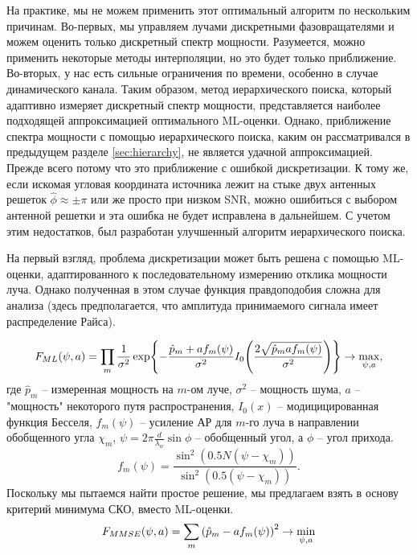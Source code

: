 На практике, мы не можем применить этот оптимальный алгоритм по нескольким
причинам. Во-первых, мы управляем лучами дискретными фазовращателями и можем
оценить только дискретный спектр мощности. Разумеется, можно применить некоторые
методы интерполяции, но это будет только приближение.  Во-вторых, у нас есть
сильные ограничения по времени, особенно в случае динамического канала.  Таким
образом, метод иерархического поиска, который адаптивно измеряет дискретный
спектр мощности, представляется наиболее подходящей аппроксимацией оптимального
ML-оценки.  Однако, приближение спектра мощности с помощью иерархического
поиска, каким он рассматривался в предыдущем разделе \eqref{sec:hierarchy}, не
является удачной аппроксимацией.  Прежде всего потому что это приближение с
ошибкой дискретизации. К тому же, если искомая угловая координата источника
лежит на стыке  двух антенных решеток $\hat \phi \approx \pm \pi$ или же просто
при низком SNR,  можно ошибиться с выбором антенной решетки и эта ошибка не
будет исправлена в дальнейшем. С учетом этим недостатков, был разработан
улучшенный алгоритм иерархического поиска.

На первый взгляд, проблема дискретизации может быть решена с помощью
ML-оценки, адаптированного к последовательному измерению отклика мощности
луча. Однако полученная в этом случае функция правдоподобия сложна для анализа
(здесь предполагается, что амплитуда принимаемого сигнала имеет распределение
Райса).

\begin{equation}
    F_{ML}(\psi, a) = \prod\limits_m \frac{1}{\sigma^2}
    \exp{-\frac{\hat p_m + a f_m(\psi)}{\sigma^2}
        I_0\qty(\frac{2\sqrt{\hat p_m a f_m(\psi)}}{\sigma^2})} \to \max_{\psi, a},
\end{equation}
где $\hat p_m$ -- измеренная мощность на $m$-ом луче, $\sigma^2$ -- мощность
шума, $a$ -- "мощность" некоторого путя распространения, $I_0(x)$ --
модицицированная функция Бесселя, $f_m(\psi)$ -- усиление АР для $m$-го луча в
направлении обобщенного угла $\chi_m$, $\psi = 2\pi \frac{d}{\lambda_w}\sin
    \phi$ -- обобщенный угол, а $\phi$ -- угол прихода.
\begin{equation}
    f_m(\psi) = \frac{\sin^2 (0.5N(\psi - \chi_m))}{\sin^2(0.5(\psi - \chi_m))}.
\end{equation}
Поскольку мы пытаемся найти простое решение, мы предлагаем взять в основу критерий минимума СКО, вместо ML-оценки.
\begin{equation}
    \label{eq:26}
    F_{MMSE}(\psi, a) = \sum\limits_m \qty(\hat p_m - a f_m(\psi))^2 \to \min_{\psi,a}
\end{equation}

